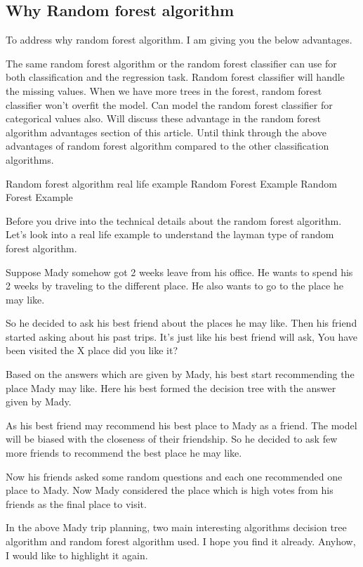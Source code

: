 \documentclass[a4paper,12pt]{article}
\begin{document}
\subsection*{Why Random forest algorithm}
To address why random forest algorithm. I am giving you the below advantages.

The same random forest algorithm or the random forest classifier can use for both classification and the regression task.
Random forest classifier will handle the missing values.
When we have more trees in the forest, random forest classifier won’t overfit the model.
Can model the random forest classifier for categorical values also.
Will discuss these advantage in the random forest algorithm advantages section of this article. Until think through the above advantages of random forest algorithm compared to the other classification algorithms.

Random forest algorithm real life example
Random Forest Example
Random Forest Example

Before you drive into the technical details about the random forest algorithm. Let’s look into a real life example to understand the layman type of random forest algorithm.

Suppose Mady somehow got 2 weeks leave from his office. He wants to spend his 2 weeks by traveling to the different place. He also wants to go to the place he may like.

So he decided to ask his best friend about the places he may like. Then his friend started asking about his past trips. It’s just like his best friend will ask, You have been visited the X place did you like it?

Based on the answers which are given by Mady, his best start recommending the place Mady may like. Here his best formed the decision tree with the answer given by Mady.

As his best friend may recommend his best place to Mady as a friend. The model will be biased with the closeness of their friendship. So he decided to ask few more friends to recommend the best place he may like.

Now his friends asked some random questions and each one recommended one place to Mady. Now  Mady considered the place which is high votes from his friends as the final place to visit.

In the above Mady trip planning, two main interesting algorithms decision tree algorithm and random forest algorithm used. I hope you find it already. Anyhow, I would like to highlight it again.
\end{document}
